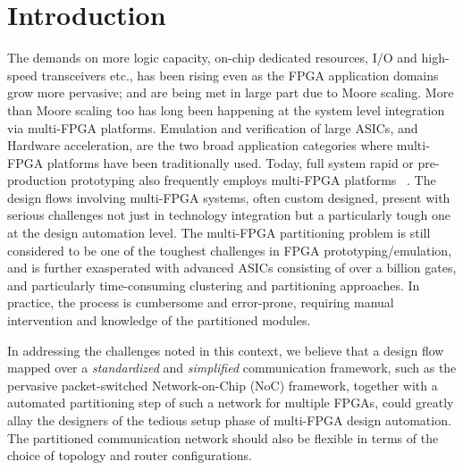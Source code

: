 \documentclass[conference, 9pt]{IEEEtran}
\newcommand{\red}[1]{\textcolor{red}{#1}}
\begin{document}
\section{Introduction}
The demands on more logic capacity, on-chip dedicated resources, I/O and high-speed transceivers etc., has been rising even as the FPGA application domains grow more pervasive; 
and are being met in large part due to Moore scaling. More than Moore scaling too has long been happening at the system level integration via multi-FPGA platforms.
Emulation and verification of large ASICs, and Hardware acceleration, are the two broad application categories where multi-FPGA platforms have been traditionally used.
Today, full system rapid or pre-production prototyping also frequently employs multi-FPGA platforms~\cite{Schelle:2010:INP:1723112.1723116}
\cite{ray2003high}%
. The design flows involving multi-FPGA systems, often custom designed, present with serious challenges not just in technology integration but a particularly tough one at 
the design automation level. The multi-FPGA partitioning problem is still considered to be one of the toughest challenges in FPGA prototyping/emulation, and is further exasperated
with advanced ASICs consisting of over a billion gates, and particularly time-consuming clustering and partitioning approaches. In practice, the process
is cumbersome and error-prone, requiring manual intervention and knowledge of the partitioned modules.


In addressing the challenges noted in this context, we believe that a design flow mapped over a \emph{standardized} and \emph{simplified} communication framework, such as the 
pervasive packet-switched Network-on-Chip (NoC) framework, together with a automated partitioning step of such a network for multiple FPGAs, could greatly allay the designers of the 
tedious setup phase of multi-FPGA design automation. The partitioned communication network should also be flexible in terms of the choice of topology and router configurations.

\end{document}
